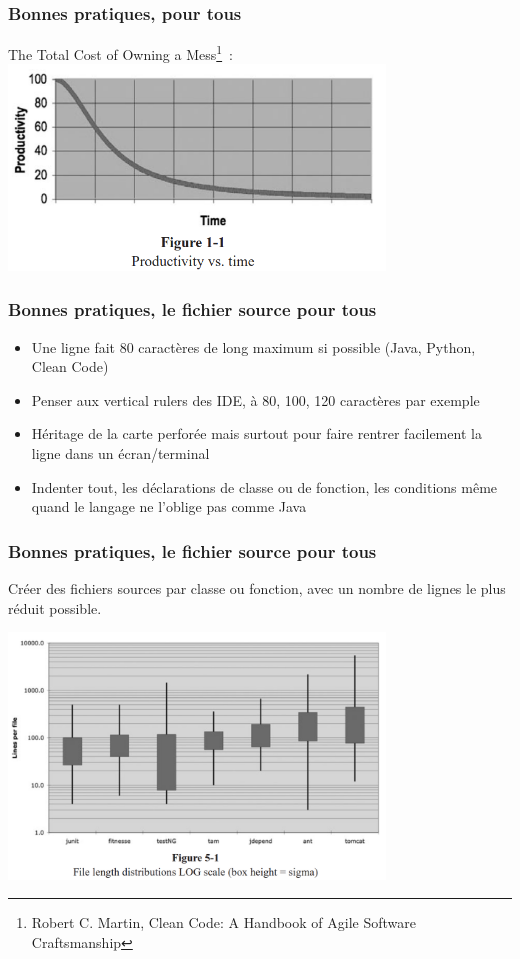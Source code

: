 \documentclass{beamer}
\begin{document}
    \begin{frame}
        \transdissolve
        \frametitle{Bonnes pratiques, pour tous}
        The Total Cost of Owning a Mess\footnote{Robert C. Martin, Clean Code: A Handbook of Agile Software Craftsmanship}~:
        \bigbreak
        \centering
        \includegraphics[width=10cm]{image/total-cost-of-a-mess.png}
    \end{frame}

    \begin{frame}
        \transdissolve
        \frametitle{Bonnes pratiques, le fichier source pour tous}
        \begin{itemize}

            \item Une ligne fait 80 caractères de long maximum si possible (Java, Python, Clean Code)
            \item Penser aux vertical rulers des IDE, à 80, 100, 120 caractères par exemple
            \item Héritage de la carte perforée mais surtout pour faire rentrer facilement la ligne dans un écran/terminal
            \item Indenter tout, les déclarations de classe ou de fonction, les conditions même quand le langage ne l'oblige pas comme Java

        \end{itemize}
    \end{frame}

    \begin{frame}
        \transdissolve
        \frametitle{Bonnes pratiques, le fichier source pour tous}

        Créer des fichiers sources par classe ou fonction, avec un nombre de lignes le plus réduit possible.

        \bigbreak
        \centering
        \includegraphics[width=10cm]{image/project-source-length.png}

    \end{frame}
\end{document}
